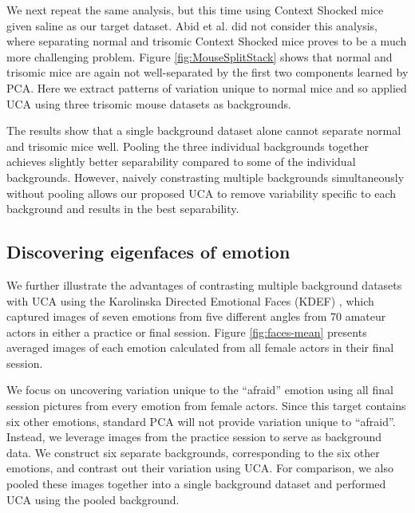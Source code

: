 \documentclass[12pt]{article}
\begin{document}
We next repeat the same analysis, but this time using Context Shocked mice given saline as our target dataset. Abid et al. \cite{Abid} did not consider this analysis, where separating normal and trisomic Context Shocked mice proves to be a much more challenging problem. Figure \ref{fig:MouseSplitStack} shows that normal and trisomic mice are again not well-separated by the first two components learned by PCA.
Here we extract patterns of variation unique to normal mice and so applied UCA using three trisomic mouse datasets as backgrounds.

The results show that a single background dataset alone cannot separate normal and trisomic mice well. Pooling the three individual backgrounds together achieves slightly better separability compared to some of the individual backgrounds. However, naively constrasting multiple backgrounds simultaneously without pooling allows our proposed UCA to remove variability specific to each background and results in the best separability.






\subsection{\label{sec:faces}Discovering eigenfaces of emotion}

We further illustrate the advantages of contrasting multiple background datasets with UCA using the Karolinska Directed Emotional Faces (KDEF) \cite{Calvo2008}, which captured images of seven emotions from five different angles from 70 amateur actors in either a practice or final session. Figure \ref{fig:faces-mean} presents averaged images of each emotion calculated from all female actors in their final session. 

We focus on uncovering variation unique to the ``afraid'' emotion using all final session pictures from every emotion from female actors. Since this target contains six other emotions, standard PCA will not provide variation unique to ``afraid''. Instead, we leverage images from the practice session to serve as background data. We construct six separate backgrounds, corresponding to the six other emotions, and contrast out their variation using UCA. For comparison, we also pooled these images together into a single background dataset and performed UCA using the pooled background.
\end{document}
